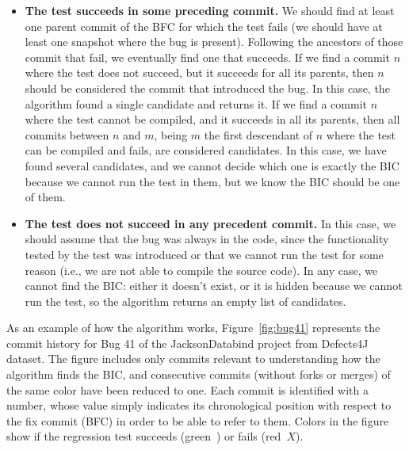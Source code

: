 \begin{itemize}
\item \textbf{The test succeeds in some preceding commit.}
  We should find at least one parent commit of the BFC for which the test fails (we should have at least one snapshot where the bug is present). 
  Following the ancestors of those commit that fail, we eventually find one that succeeds. 
  If we find a commit $n$ where the test does not succeed, but it succeeds for all its parents, then $n$ should be considered the commit that introduced the bug. 
  In this case, the algorithm found a single candidate and returns it. If we find a commit $n$ where the test cannot be compiled, and it succeeds in all its parents, then all commits between $n$ and $m$, being $m$ the first descendant of $n$ where the test can be compiled and fails, are considered candidates. 
  In this case, we have found several candidates, and we cannot decide which one is exactly the BIC because we cannot run the test in them, but we know the BIC should be one of them.
\item \textbf{The test does not succeed in any precedent commit.}
  In this case, we should assume that the bug was always in the code, since the functionality tested by the test was introduced or that we cannot run the test for some reason (i.e., we are not able to compile the source code). In any case, we cannot find the BIC: either it doesn't exist, or it is hidden because we cannot run the test, so the algorithm returns an empty list of candidates.
\end{itemize}

As an example of how the algorithm works, Figure~\ref{fig:bug41} represents the commit history for Bug 41 of the JacksonDatabind project from Defects4J dataset. 
The figure includes only commits relevant to understanding how the algorithm finds the BIC, and consecutive commits (without forks or merges) of the same color have been reduced to one. 
Each commit is identified with a number, whose value simply indicates its chronological position with respect to the fix commit (BFC) in order to be able to refer to them.
Colors in the figure show if the regression test succeeds (green~\checkmark) or fails (red~$X$).

